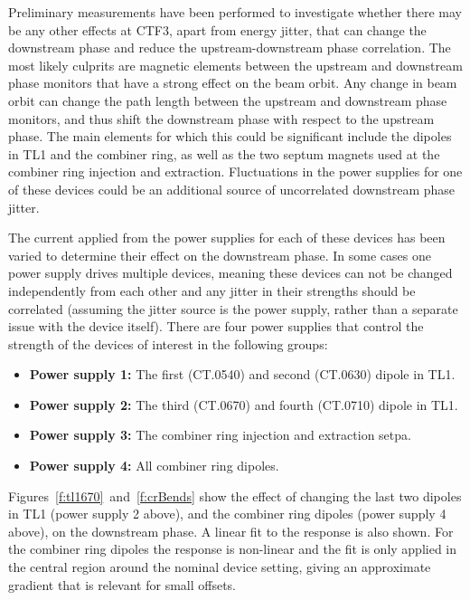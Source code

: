 Preliminary measurements have been performed to investigate whether there may be any other effects at CTF3, apart from energy jitter, that can change the downstream phase and reduce the upstream-downstream phase correlation. The most likely culprits are magnetic elements between the upstream and downstream phase monitors that have a strong effect on the beam orbit. Any change in beam orbit can change the path length between the upstream and downstream phase monitors, and thus shift the downstream phase with respect to the upstream phase. The main elements for which this could be significant include the dipoles in TL1 and the combiner ring, as well as the two septum magnets used  at the combiner ring injection and extraction. Fluctuations in the power supplies for one of these devices could be an additional source of uncorrelated downstream phase jitter.

The current applied from the power supplies for each of these devices has been varied to determine their effect on the downstream phase. In some cases one power supply drives multiple devices, meaning these devices can not be changed independently from each other and any jitter in their strengths should be correlated (assuming the jitter source is the power supply, rather than a separate issue with the device itself). There are four power supplies that control the strength of the devices of interest in the following groups:
\begin{itemize}
\item \textbf{Power supply 1:} The first (CT.0540) and second (CT.0630) dipole in TL1.
\item \textbf{Power supply 2:} The third (CT.0670) and fourth (CT.0710) dipole in TL1.
\item \textbf{Power supply 3:} The combiner ring injection and extraction setpa.
\item \textbf{Power supply 4:} All combiner ring dipoles.
\end{itemize}
Figures~\ref{f:tl1670}~and~\ref{f:crBends} show the effect of changing the last two dipoles in TL1 (power supply 2 above), and the combiner ring dipoles (power supply 4 above), on the downstream phase. A linear fit to the response is also shown. For the combiner ring dipoles the response is non-linear and the fit is only applied in the central region around the nominal device setting, giving an approximate gradient that is relevant for small offsets. %

